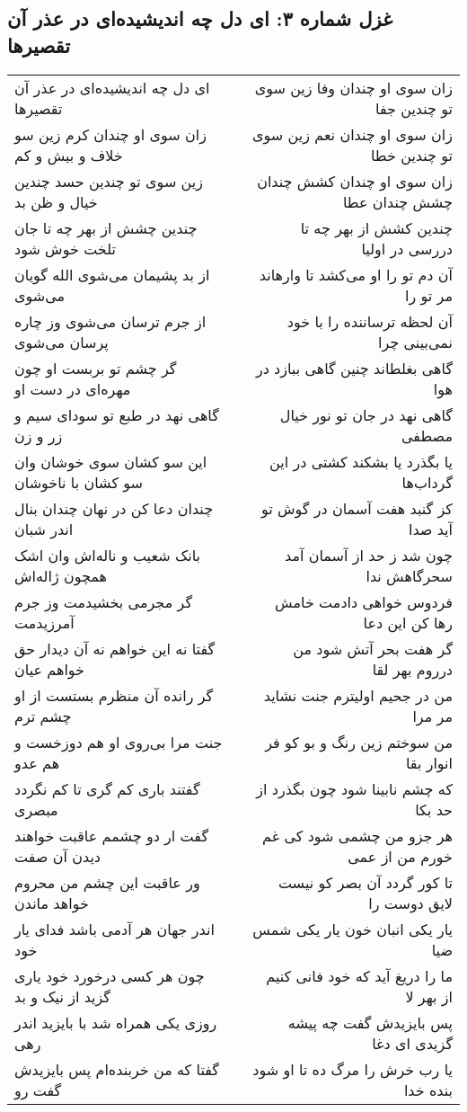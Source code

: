 \begin{center}
\section*{غزل شماره ۳: ای دل چه اندیشیده‌ای در عذر آن تقصیرها}
\label{sec:0003}
\begin{longtable}{l p{0.5cm} r}
ای دل چه اندیشیده‌ای در عذر آن تقصیرها
&&
زان سوی او چندان وفا زین سوی تو چندین جفا
\\
زان سوی او چندان کرم زین سو خلاف و بیش و کم
&&
زان سوی او چندان نعم زین سوی تو چندین خطا
\\
زین سوی تو چندین حسد چندین خیال و ظن بد
&&
زان سوی او چندان کشش چندان چشش چندان عطا
\\
چندین چشش از بهر چه تا جان تلخت خوش شود
&&
چندین کشش از بهر چه تا دررسی در اولیا
\\
از بد پشیمان می‌شوی الله گویان می‌شوی
&&
آن دم تو را او می‌کشد تا وارهاند مر تو را
\\
از جرم ترسان می‌شوی وز چاره پرسان می‌شوی
&&
آن لحظه ترساننده را با خود نمی‌بینی چرا
\\
گر چشم تو بربست او چون مهره‌ای در دست او
&&
گاهی بغلطاند چنین گاهی ببازد در هوا
\\
گاهی نهد در طبع تو سودای سیم و زر و زن
&&
گاهی نهد در جان تو نور خیال مصطفی
\\
این سو کشان سوی خوشان وان سو کشان با ناخوشان
&&
یا بگذرد یا بشکند کشتی در این گرداب‌ها
\\
چندان دعا کن در نهان چندان بنال اندر شبان
&&
کز گنبد هفت آسمان در گوش تو آید صدا
\\
بانک شعیب و ناله‌اش وان اشک همچون ژاله‌اش
&&
چون شد ز حد از آسمان آمد سحرگاهش ندا
\\
گر مجرمی بخشیدمت وز جرم آمرزیدمت
&&
فردوس خواهی دادمت خامش رها کن این دعا
\\
گفتا نه این خواهم نه آن دیدار حق خواهم عیان
&&
گر هفت بحر آتش شود من درروم بهر لقا
\\
گر رانده آن منظرم بستست از او چشم ترم
&&
من در جحیم اولیترم جنت نشاید مر مرا
\\
جنت مرا بی‌روی او هم دوزخست و هم عدو
&&
من سوختم زین رنگ و بو کو فر انوار بقا
\\
گفتند باری کم گری تا کم نگردد مبصری
&&
که چشم نابینا شود چون بگذرد از حد بکا
\\
گفت ار دو چشمم عاقبت خواهند دیدن آن صفت
&&
هر جزو من چشمی شود کی غم خورم من از عمی
\\
ور عاقبت این چشم من محروم خواهد ماندن
&&
تا کور گردد آن بصر کو نیست لایق دوست را
\\
اندر جهان هر آدمی باشد فدای یار خود
&&
یار یکی انبان خون یار یکی شمس ضیا
\\
چون هر کسی درخورد خود یاری گزید از نیک و بد
&&
ما را دریغ آید که خود فانی کنیم از بهر لا
\\
روزی یکی همراه شد با بایزید اندر رهی
&&
پس بایزیدش گفت چه پیشه گزیدی ای دغا
\\
گفتا که من خربنده‌ام پس بایزیدش گفت رو
&&
یا رب خرش را مرگ ده تا او شود بنده خدا
\\
\end{longtable}
\end{center}

